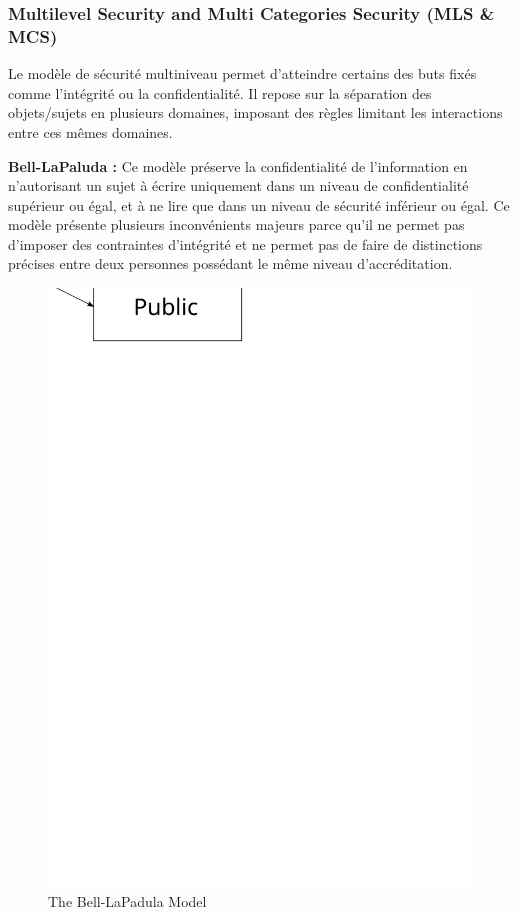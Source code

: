 \documentclass[pdftex,a4paper,titlepage,11pt]{article}
\begin{document}
\subsubsection{Multilevel Security and Multi Categories Security (MLS \& MCS)}

Le modèle de sécurité multiniveau permet d'atteindre certains des buts fixés comme l'intégrité ou la confidentialité. Il repose sur la séparation des objets/sujets en plusieurs domaines, imposant des règles limitant les interactions entre ces mêmes domaines.

\bigskip

\textbf{Bell-LaPaluda :} Ce modèle préserve la confidentialité de l'information en n'autorisant un sujet à écrire uniquement dans un niveau de confidentialité supérieur ou égal, et à ne lire que dans un niveau de sécurité inférieur ou égal. Ce modèle présente plusieurs inconvénients majeurs parce qu'il ne permet pas d'imposer des contraintes d'intégrité et ne permet pas de faire de distinctions précises entre deux personnes possédant le même niveau d'accréditation.

\begin{figure}[h]
	\centering
	\includegraphics[scale=0.5]{bell-lp}
	\caption{The Bell-LaPadula Model}
\end{figure}
\end{document}
